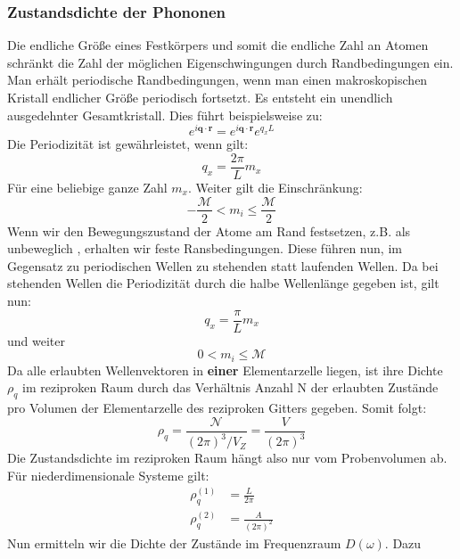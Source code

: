 \documentclass[11pt]{article}
\begin{document}
\subsubsection{Zustandsdichte der Phononen}
Die endliche Größe eines Festkörpers und somit die endliche Zahl an Atomen
schränkt die Zahl der möglichen Eigenschwingungen durch Randbedingungen ein.
Man erhält periodische Randbedingungen, wenn man einen makroskopischen Kristall
endlicher Größe periodisch fortsetzt. Es entsteht ein unendlich ausgedehnter
Gesamtkristall. Dies führt beispielsweise zu:
\begin{equation}
  e^{i\bm{q}\cdot\bm{r}}=e^{i\bm{q}\cdot\bm{r}}e^{q_xL}
\end{equation}
Die Periodizität ist gewährleistet, wenn gilt:
\begin{equation}
  q_x = \frac{2\pi}{L}m_x
\end{equation}
Für eine beliebige ganze Zahl $m_x$. Weiter gilt die Einschränkung:
\begin{equation}
  -\frac{\mathcal{M}}{2}<m_i\leq\frac{\mathcal{M}}{2}
\end{equation}
Wenn wir den Bewegungszustand der Atome am Rand festsetzen, z.B. als unbeweglich
, erhalten wir feste Ransbedingungen. Diese führen nun, im Gegensatz zu
periodischen Wellen zu stehenden statt laufenden Wellen. Da bei stehenden
Wellen die Periodizität durch die halbe Wellenlänge gegeben ist, gilt nun:
\begin{equation}
  q_x = \frac{\pi}{L}m_x
\end{equation}
und weiter
\begin{equation}
  0<m_i\leq\mathcal{M}
\end{equation}
Da alle erlaubten Wellenvektoren in \textbf{einer} Elementarzelle liegen, ist
ihre Dichte $\rho_q$ im reziproken Raum durch das Verhältnis Anzahl N der
erlaubten Zustände pro Volumen der Elementarzelle des reziproken Gitters
gegeben. Somit folgt:
\begin{equation}
  \rho_q=\frac{\mathcal{N}}{(2\pi)^3/V_Z}=\frac{V}{(2\pi)^3}
\end{equation}
Die Zustandsdichte im reziproken Raum hängt also nur vom Probenvolumen ab. Für
niederdimensionale Systeme gilt:
\begin{equation}
  \begin{align}
    \rho_q^{(1)}&=\frac{L}{2\pi} \\
    \rho_q^{(2)}&=\frac{A}{(2\pi)^2}
  \end{align}
\end{equation}
Nun ermitteln wir die Dichte der Zustände im Frequenzraum $D(\omega)$. Dazu
\end{document}
